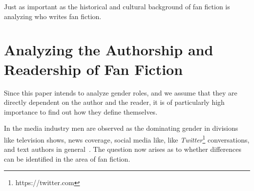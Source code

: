 Just as important as the historical and cultural background of fan fiction is analyzing who writes fan fiction.


\section{Analyzing the Authorship and Readership of Fan Fiction}\label{sec:analyzing-the-authorship-and-readership-of-fan-fiction}

Since this paper intends to analyze gender roles, and we assume that they are directly dependent on the author and the reader, it is of particularly high importance to find out how they define themselves.

In the media industry men are observed as the dominating gender in divisions like television shows, news coverage, social media like, like \emph{Twitter}\footnote{https://twitter.com} conversations, and text authors in general~\citep{Milli2016BeyondFanfiction, Bergstrom2012WhatsIt, Bretthauer2007AMusic, Jia2015MeasuringImages, Garcia2014GenderMedia}.
The question now arises as to whether differences can be identified in the area of fan fiction.

